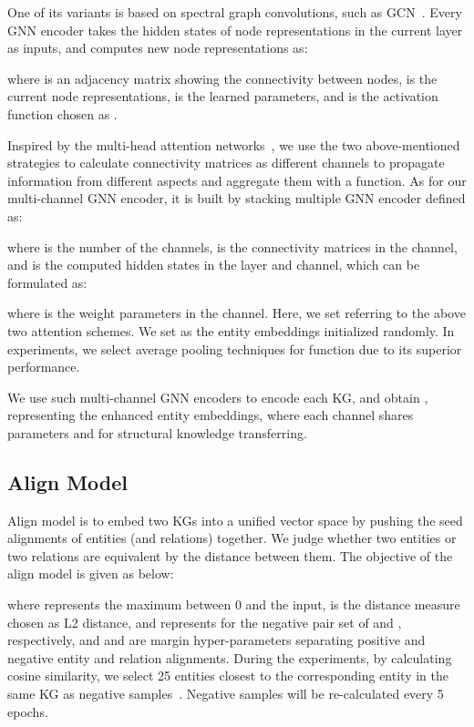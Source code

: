 \documentclass[11pt,a4paper]{article}
\begin{document}
One of its variants is based on spectral graph convolutions, such as GCN~\cite{kipf2016semi}. Every GNN encoder takes the hidden states of node representations in the current layer as inputs, and computes new node representations as:


where  is an adjacency matrix showing the connectivity between nodes,  is the current node representations,  is the learned parameters, and  is the activation function chosen as .

Inspired by the multi-head attention networks~\cite{velivckovic2018graph}, we use the two above-mentioned strategies to calculate connectivity matrices as different channels to propagate information from different aspects and aggregate them with a  function. As for our multi-channel GNN encoder, it is built by stacking multiple GNN encoder defined as:


where  is the number of the channels,  is the connectivity matrices in the  channel, and  is the computed hidden states in the  layer and  channel, which can be formulated as:


where  is the weight parameters in the  channel. Here, we set  referring to the above two attention schemes. We set  as the entity embeddings initialized randomly. In experiments, we select average pooling techniques for  function due to its superior performance.

We use such multi-channel GNN encoders to encode each KG, and obtain ,  representing the enhanced entity embeddings, where each channel shares parameters  and  for structural knowledge transferring.

\subsection{Align Model}
Align model is to embed two KGs into a unified vector space by pushing the seed alignments of entities (and relations) together. We judge whether two entities or two relations are equivalent by the distance between them. The objective of the align model is given as below:


where  represents the maximum between 0 and the input,  is the distance measure chosen as L2 distance,  and  represents for the negative pair set of  and , respectively, and  and  are margin hyper-parameters separating positive and negative entity and relation alignments. During the experiments, by calculating cosine similarity, we select 25 entities closest to the corresponding entity in the same KG as negative samples~\cite{sun2018bootstrapping}. Negative samples will be re-calculated every 5 epochs.
\end{document}
